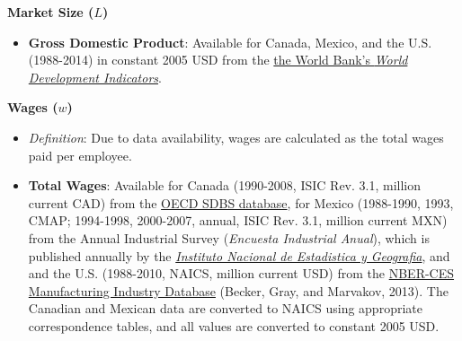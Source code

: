 \begin{spacing}{1}
\begin{itemize}
	\end{itemize}	


\noindent \textbf{Market Size ($L$)}
	\begin{itemize}
	
	\item \textbf{Gross Domestic Product}: Available for Canada, Mexico, and the U.S. (1988-2014) in constant 2005 USD from the \href{http://data.worldbank.org/data-catalog/world-development-indicators}{the World Bank's \emph{World Development Indicators}}.
		
	\end{itemize}	
	
\noindent \textbf{Wages ($w$)}
	\begin{itemize}
	
	\item \emph{Definition}: Due to data availability, wages are calculated as the total wages paid per employee.

	\item \textbf{Total Wages}: Available for Canada (1990-2008, ISIC Rev. 3.1, million current CAD) from the \href{http://stats.oecd.org/index.aspx?queryid=224}{OECD SDBS database}, for Mexico (1988-1990, 1993, CMAP; 1994-1998, 2000-2007, annual, ISIC Rev. 3.1, million current MXN) from the Annual Industrial Survey (\emph{Encuesta Industrial Anual}), which is published annually by   the \href{http://buscador.inegi.org.mx/search?q=encuesta+industrial+anual&client=ProductosR&proxystylesheet=ProductosR&num=10&getfields=*&sort=meta:edicion:D:E:::D&entsp=a__inegi_politica_p72&lr=lang_es\%7Clang_en&oe=UTF-8&ie=UTF-8&ip=10.210.100.253&entqr=3&filter=0&site=ProductosBuscador&tlen=260&ulang=en&start=0}{\emph{Instituto Nacional de Estadistica y Geografia}}, and and the U.S. (1988-2010, NAICS, million current USD) from the \href{http://www.nber.org/nberces/}{NBER-CES Manufacturing Industry Database} (Becker, Gray, and Marvakov, 2013). The Canadian and Mexican data are converted to NAICS using appropriate correspondence tables, and all values are converted to constant 2005 USD. 
		
	\end{itemize}	

\end{spacing}